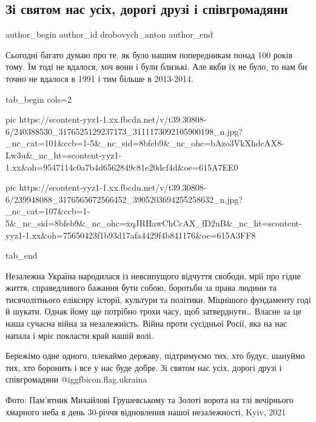  
 
 
 
 
 
\subsection{Зі святом нас усіх, дорогі друзі і співгромадяни}
\label{sec:24_08_2021.fb.drobovych_anton.1.nezalezhnist_svjato}
 
\ifcmt
 author_begin
   author_id drobovych_anton
 author_end
\fi

Сьогодні багато думаю про те, як було нашим попередникам понад 100 років тому.
Їм тоді не вдалося, хоч вони і були близькі. Але якби їх не було, то нам би
точно не вдалося в 1991 і тим більше в 2013-2014.


\ifcmt
  tab_begin cols=2

     pic https://scontent-yyz1-1.xx.fbcdn.net/v/t39.30808-6/240388530_3176525129237173_3111173092105900198_n.jpg?_nc_cat=101&ccb=1-5&_nc_sid=8bfeb9&_nc_ohc=bAzo3VkXhdcAX8-Lw3u&_nc_ht=scontent-yyz1-1.xx&oh=9547114c0a7b4d6562849c81e20dcf4d&oe=615A7EE0

     pic https://scontent-yyz1-1.xx.fbcdn.net/v/t39.30808-6/239948088_3176565672566452_3905203694255258632_n.jpg?_nc_cat=107&ccb=1-5&_nc_sid=8bfeb9&_nc_ohc=xqJRHawChCcAX_fD2uB&_nc_ht=scontent-yyz1-1.xx&oh=75650423f1b93d17afa4429f4b841176&oe=615A3FF8

  tab_end
\fi

Незалежна Україна народилася із невсипущого відчуття свободи, мрії про гідне
життя, справедливого бажання бути собою, боротьби за права людини та
тисячолітнього еліксиру історії, культури та політики. Міцнішого фундаменту
годі й шукати. Однак йому ще потрібно трохи часу, щоб затверднути… Власне за це
наша сучасна війна за незалежність. Війна проти сусідньої Росії, яка на нас
напала і мріє покласти край нашій волі. 

Бережімо одне одного, плекаймо державу, підтримуємо тих, хто будує, шануймо
тих, хто боронить і все у нас буде добре.  Зі святом нас усіх, дорогі друзі і
співгромадяни @igg{fbicon.flag.ukraina}

Фото: Пам’ятник Михайлові Грушевському та Золоті ворота на тлі вечірнього
хмарного неба в день 30-річчя відновлення нашої незалежності, Kyiv, 2021

